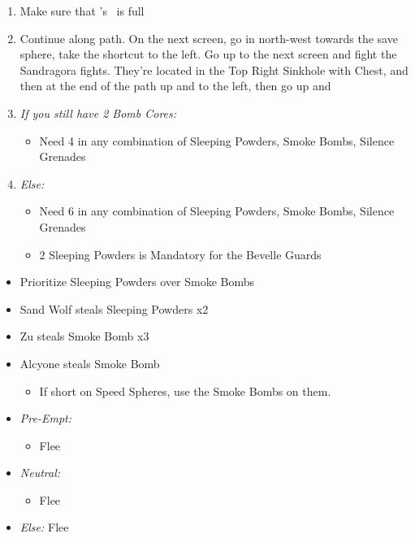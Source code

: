   \begin{enumerate}[resume]
  \item Make sure that \rikku's \od\ is full
  \item Continue along path. On the next screen, go in north-west towards the save sphere, take the shortcut to the left. Go up to the next screen and fight the Sandragora fights. They're located in the Top Right Sinkhole with Chest, and then at the end of the path up and to the left, then go up and \sd
  \item \textit{If you still have 2 Bomb Cores:}
  \begin{itemize}
	\item Need 4 in any combination of Sleeping Powders, Smoke Bombs, Silence Grenades
  \end{itemize}
  \item \textit{Else:}
  \begin{itemize}
  	\item Need 6 in any combination of Sleeping Powders, Smoke Bombs, Silence Grenades
  	\item 2 Sleeping Powders is Mandatory for the Bevelle Guards
  \end{itemize}
\end{enumerate}
\begin{encounters}
  \begin{itemize}
    \item Prioritize Sleeping Powders over Smoke Bombs
    \item Sand Wolf steals Sleeping Powders x2
    \item Zu steals Smoke Bomb x3
    \item Alcyone steals Smoke Bomb
          \begin{itemize}
            \item If short on Speed Spheres, use the Smoke Bombs on them.
          \end{itemize}
	\item \textit{Pre-Empt:}
	\begin{itemize}
	\tidusf Defend
	\rikkuf Steal
	\auronf Defend
	\item Flee
 	\end{itemize}
 	\item \textit{Neutral:}
 	\begin{itemize}
	\switch{\tidus}{\kimahri}
 	\kimahrif Steal
 	\switch{\rikku}{\tidus}
 	\item Flee
 	\end{itemize}
	\item \textit{Else:} Flee
  \end{itemize}
\end{encounters}
